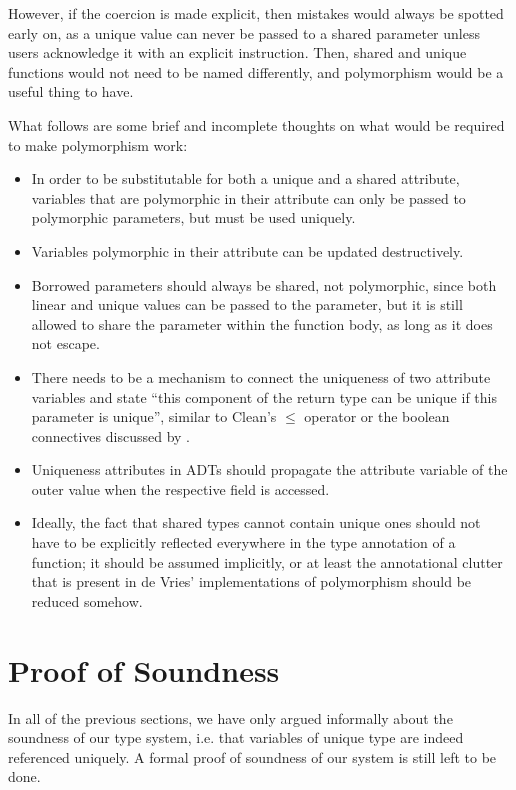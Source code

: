 However, if the coercion is made explicit, then mistakes would always be spotted early on, as a unique value can never be passed to a shared parameter unless users acknowledge it with an explicit instruction. Then, shared and unique functions would not need to be named differently, and polymorphism would be a useful thing to have.

What follows are some brief and incomplete thoughts on what would be required to make polymorphism work:
\begin{itemize}
	\item In order to be substitutable for both a unique and a shared attribute, variables that are polymorphic in their attribute can only be passed to polymorphic parameters, but must be used uniquely.
	\item Variables polymorphic in their attribute can be updated destructively.
	\item Borrowed parameters should always be shared, not polymorphic, since both linear and unique values can be passed to the parameter, but it is still allowed to share the parameter within the function body, as long as it does not escape.
	\item There needs to be a mechanism to connect the uniqueness of two attribute variables and state ``this component of the return type can be unique if this parameter is unique'', similar to Clean's $\leq$ operator or the boolean connectives discussed by \cite{vries_making_2009}.
	\item Uniqueness attributes in ADTs should propagate the attribute variable of the outer value when the respective field is accessed.
	\item Ideally, the fact that shared types cannot contain unique ones should not have to be explicitly reflected everywhere in the type annotation of a function; it should be assumed implicitly, or at least the annotational clutter that is present in de Vries' implementations of polymorphism should be reduced somehow.
\end{itemize}

\section{Proof of Soundness}
In all of the previous sections, we have only argued informally about the soundness of our type system, i.e. that variables of unique type are indeed referenced uniquely. A formal proof of soundness of our system is still left to be done.